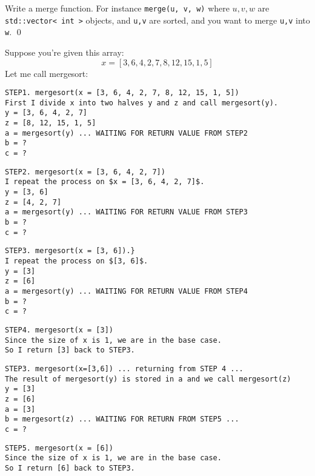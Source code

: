 \newpage
\begin{ex}
  Write a merge function.
  For instance \verb!merge(u, v, w)! where $u,v,w$ are \verb!std::vector< int >!
  objects, and \verb!u,v! are sorted, and you want to merge \verb!u,v! into \verb!w!. 
\qed
\end{ex}



\newpage
Suppose you're given this array:
\[
x = [3, 6, 4, 2, 7, 8, 12, 15, 1, 5]
\]
Let me call mergesort:

\begin{Verbatim}[frame=single, fontsize=\footnotesize]
STEP1. mergesort(x = [3, 6, 4, 2, 7, 8, 12, 15, 1, 5])
First I divide x into two halves y and z and call mergesort(y).
y = [3, 6, 4, 2, 7]
z = [8, 12, 15, 1, 5]
a = mergesort(y) ... WAITING FOR RETURN VALUE FROM STEP2
b = ?
c = ?
\end{Verbatim}

\begin{Verbatim}[frame=single, fontsize=\footnotesize]
STEP2. mergesort(x = [3, 6, 4, 2, 7])
I repeat the process on $x = [3, 6, 4, 2, 7]$.
y = [3, 6]
z = [4, 2, 7]
a = mergesort(y) ... WAITING FOR RETURN VALUE FROM STEP3
b = ?
c = ?
\end{Verbatim}

\begin{Verbatim}[frame=single, fontsize=\footnotesize]
STEP3. mergesort(x = [3, 6]).}
I repeat the process on $[3, 6]$.
y = [3]
z = [6]
a = mergesort(y) ... WAITING FOR RETURN VALUE FROM STEP4
b = ?
c = ?
\end{Verbatim}

\begin{Verbatim}[frame=single, fontsize=\footnotesize]
STEP4. mergesort(x = [3])
Since the size of x is 1, we are in the base case. 
So I return [3] back to STEP3.
\end{Verbatim}

\begin{Verbatim}[frame=single, fontsize=\footnotesize]
STEP3. mergesort(x=[3,6]) ... returning from STEP 4 ...
The result of mergesort(y) is stored in a and we call mergesort(z) 
y = [3]
z = [6]
a = [3]
b = mergesort(z) ... WAITING FOR RETURN FROM STEP5 ...
c = ?
\end{Verbatim}

\begin{Verbatim}[frame=single, fontsize=\footnotesize]
STEP5. mergesort(x = [6])
Since the size of x is 1, we are in the base case. 
So I return [6] back to STEP3.
\end{Verbatim}

